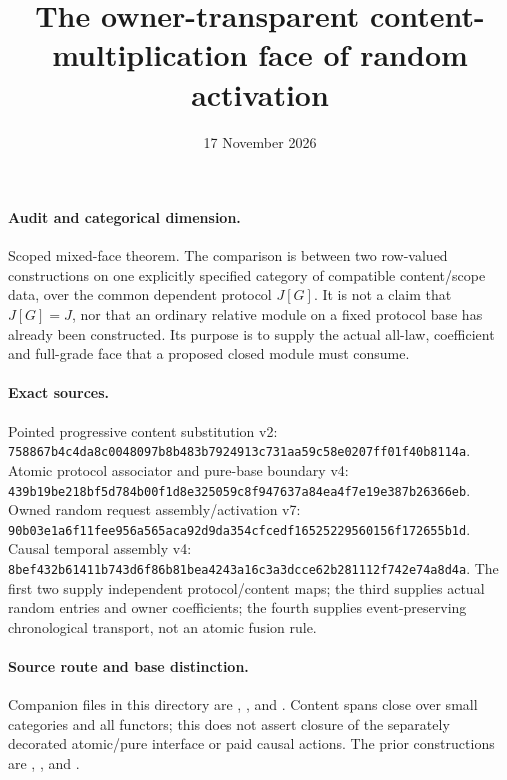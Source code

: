 \documentclass[11pt]{article}\usepackage{amsmath,amssymb,amsthm,geometry}\geometry{margin=1in}
\title{The owner-transparent content-multiplication face of random activation}
\date{17 November 2026}
\begin{document}
\maketitle
\paragraph{Audit and categorical dimension.} Scoped mixed-face theorem. The comparison is between two row-valued constructions on one explicitly specified category of compatible content/scope data, over the common dependent protocol $J[G]$. It is not a claim that $J[G]=J$, nor that an ordinary relative module on a fixed protocol base has already been constructed. Its purpose is to supply the actual all-law, coefficient and full-grade face that a proposed closed module must consume.

\paragraph{Exact sources.} Pointed progressive content substitution v2: \texttt{758867b4c4da8c0048097b8b483b7924913c731aa59c58e0207ff01f40b8114a}. Atomic protocol associator and pure-base boundary v4: \texttt{439b19be218bf5d784b00f1d8e325059c8f947637a84ea4f7e19e387b26366eb}. Owned random request assembly/activation v7: \texttt{90b03e1a6f11fee956a565aca92d9da354cfcedf16525229560156f172655b1d}. Causal temporal assembly v4: \texttt{8bef432b61411b743d6f86b81bea4243a16c3a3dcce62b281112f742e74a8d4a}. The first two supply independent protocol/content maps; the third supplies actual random entries and owner coefficients; the fourth supplies event-preserving chronological transport, not an atomic fusion rule.

\paragraph{Source route and base distinction.} Companion files in this directory are \texttt{}, \texttt{}, and \texttt{}. Content spans close over small categories and all functors; this does not assert closure of the separately decorated atomic/pure interface or paid causal actions. The prior constructions are \texttt{}, \texttt{}, and \texttt{}.
\end{document}
